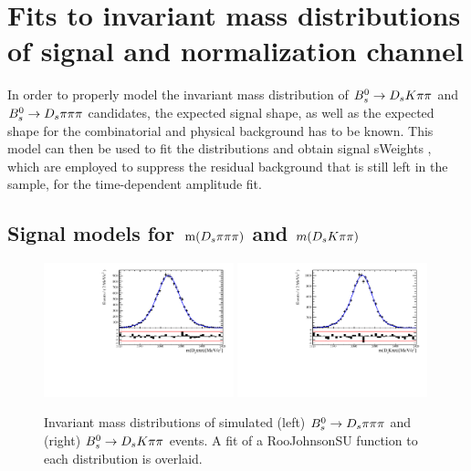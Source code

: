 \section{Fits to invariant mass distributions of signal and normalization channel}
\label{sec: massfits}

In order to properly model the invariant mass distribution of ${{B}^0_{s}}\rightarrow{\ensuremath{{D}_{s}}}{\ensuremath{K}}{\ensuremath{\pi}}{\ensuremath{\pi}}$ and ${{B}^0_{s}}\rightarrow{\ensuremath{{D}_{s}}}{\ensuremath{\pi}}{\ensuremath{\pi}}{\ensuremath{\pi}}$ candidates, 
the expected signal shape, as well as the expected shape for the combinatorial and physical background has to be known. 
This model can then be used to fit the distributions and obtain signal sWeights \cite{Pivk:2004ty}, 
which are employed to suppress the residual background that is still left in the sample, for the time-dependent amplitude fit.   

\subsection{Signal models for $\mathrm{ \,m}({{D}_{s}}{\pi}{\pi}{\pi})$ and $m({{D}_{s}}{K}{\pi}{\pi})$}
\label{subsec:signalmodel}

\begin{figure}[h]
\includegraphics[height=7.cm,width=0.49\textwidth]{figs/MassFit/normMC_pull.pdf}
\includegraphics[height=7.cm,width=0.49\textwidth]{figs/MassFit/signalMC_pull.pdf}
\caption{Invariant mass distributions of simulated (left) ${{B}^0_{s}}\rightarrow{\ensuremath{{D}_{s}}}{\ensuremath{\pi}}{\ensuremath{\pi}}{\ensuremath{\pi}}$ and (right) ${{B}^0_{s}}\rightarrow{\ensuremath{{D}_{s}}}{\ensuremath{K}}{\ensuremath{\pi}}{\ensuremath{\pi}}$ events. A fit of a RooJohnsonSU function to each distribution is overlaid.}
\label{fig: BsMassShapes}
\end{figure}

